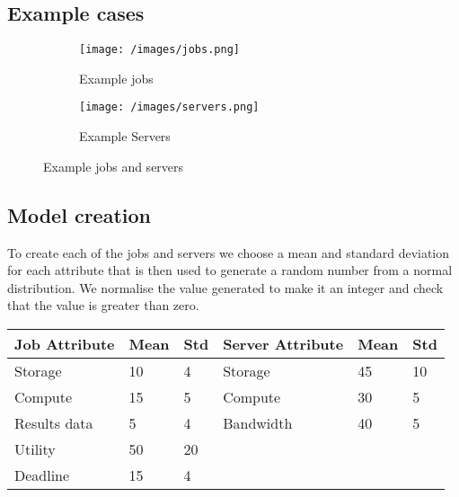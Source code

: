 \subsection{Example cases}\label{subsec:example-cases}
\begin{figure}[H]
    \begin{subfigure}{0.5\textwidth}
        \texttt{[image: /images/jobs.png]}
        \caption{Example jobs}
    \end{subfigure}
    \begin{subfigure}{0.5\textwidth}
        \texttt{[image: /images/servers.png]}
        \caption{Example Servers}
    \end{subfigure}

    \caption{Example jobs and servers}
\end{figure}

\subsection{Model creation}\label{subsec:model-creation}
To create each of the jobs and servers we choose a mean and standard deviation for each attribute that is then
used to generate a random number from a normal distribution.
We normalise the value generated to make it an integer and check that the value is greater than zero. \\

\begin{tabu} to 1\textwidth { | X[l] | X[l] | X[l] | X[l] | X[l] | X[l] | }
\hline
Job Attribute & Mean & Std & Server Attribute & Mean & Std \\
\hline
Storage & 10 & 4 & Storage & 45 & 10 \\
\hline
Compute & 15 & 5 & Compute & 30 & 5 \\
\hline
Results data & 5 & 4 & Bandwidth & 40 & 5 \\
\hline
Utility & 50 & 20 & & & \\
\hline
Deadline & 15 & 4 & & & \\
\hline
\end{tabu}


